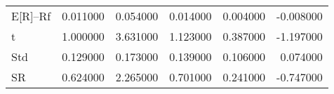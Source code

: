 \begin{tabular}{lrrrrr}
\toprule
\midrule
E[R]--Rf & 0.011000 & 0.054000 & 0.014000 & 0.004000 & -0.008000 \\
t & 1.000000 & 3.631000 & 1.123000 & 0.387000 & -1.197000 \\
Std & 0.129000 & 0.173000 & 0.139000 & 0.106000 & 0.074000 \\
SR & 0.624000 & 2.265000 & 0.701000 & 0.241000 & -0.747000 \\
\bottomrule
\end{tabular}
